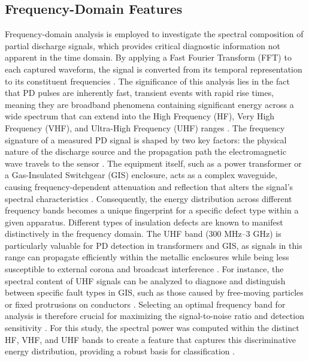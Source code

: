 \subsection{Frequency-Domain Features}

Frequency-domain analysis is employed to investigate the spectral composition of partial discharge signals, which provides critical diagnostic information not apparent in the time domain. By applying a Fast Fourier Transform (FFT) to each captured waveform, the signal is converted from its temporal representation to its constituent frequencies \parencite{Li_2018}. The significance of this analysis lies in the fact that PD pulses are inherently fast, transient events with rapid rise times, meaning they are broadband phenomena containing significant energy across a wide spectrum that can extend into the High Frequency (HF), Very High Frequency (VHF), and Ultra-High Frequency (UHF) ranges \parencite{Darwish_2019}. The frequency signature of a measured PD signal is shaped by two key factors: the physical nature of the discharge source and the propagation path the electromagnetic wave travels to the sensor \parencite{Azirani_2021}. The equipment itself, such as a power transformer or a Gas-Insulated Switchgear (GIS) enclosure, acts as a complex waveguide, causing frequency-dependent attenuation and reflection that alters the signal's spectral characteristics \parencite{Promwong_2020}. Consequently, the energy distribution across different frequency bands becomes a unique fingerprint for a specific defect type within a given apparatus. Different types of insulation defects are known to manifest distinctively in the frequency domain. The UHF band (300 MHz--3 GHz) is particularly valuable for PD detection in transformers and GIS, as signals in this range can propagate efficiently within the metallic enclosures while being less susceptible to external corona and broadcast interference \parencite{Salah_2022}. For instance, the spectral content of UHF signals can be analyzed to diagnose and distinguish between specific fault types in GIS, such as those caused by free-moving particles or fixed protrusions on conductors \parencite{Ren_2021_1}. Selecting an optimal frequency band for analysis is therefore crucial for maximizing the signal-to-noise ratio and detection sensitivity \parencite{Azirani_2021}. For this study, the spectral power was computed within the distinct HF, VHF, and UHF bands to create a feature that captures this discriminative energy distribution, providing a robust basis for classification \parencite{Maneerot_2019}.

